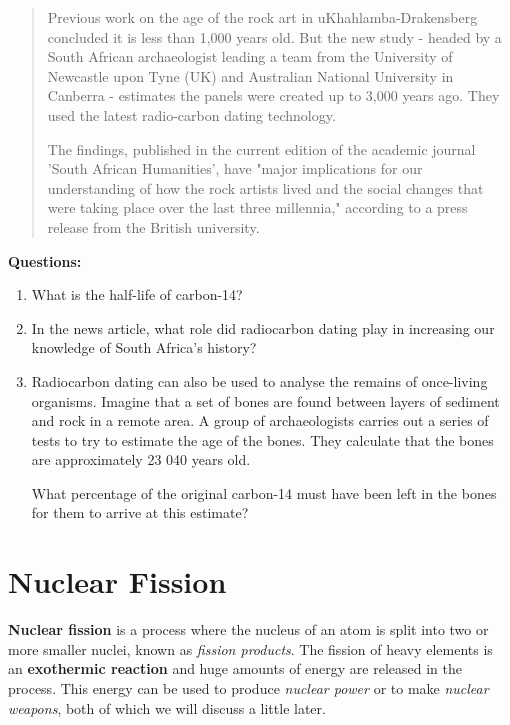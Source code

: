 \begin{itemize}
{\begin{quote}
Previous work on the age of the rock art in uKhahlamba-Drakensberg concluded it is less than 1,000 years old. But the new study - headed by a South African archaeologist leading a team from the University of Newcastle upon Tyne (UK) and Australian National University in Canberra - estimates the panels were created up to 3,000 years ago. They used the latest radio-carbon dating technology. 

The findings, published in the current edition of the academic journal 'South African Humanities', have "major implications for our understanding of how the rock artists lived and the social changes that were taking place over the last three millennia," according to a press release from the British university. \\
\end{quote}

\textbf{Questions:}

\begin{enumerate}
\item{What is the half-life of carbon-14?}
\item{In the news article, what role did radiocarbon dating play in increasing our knowledge of South Africa's history?}
\item{Radiocarbon dating can also be used to analyse the remains of once-living organisms. Imagine that a set of bones are found between layers of sediment and rock in a remote area. A group of archaeologists carries out a series of tests to try to estimate the age of the bones. They calculate that the bones are approximately 23 040 years old. 

What percentage of the original carbon-14 must have been left in the bones for them to arrive at this estimate?}
\end{enumerate}
}

\end{itemize}







\section{Nuclear Fission}
\label{sec:an:nfiss}

\textbf{Nuclear fission} is a process where the nucleus of an atom is split into two or more smaller nuclei, known as \textit{fission products}. The fission of heavy elements is an \textbf{exothermic reaction} and huge amounts of energy are released in the process. This energy can be used to produce \textit{nuclear power} or to make \textit{nuclear weapons}, both of which we will discuss a little later. 


